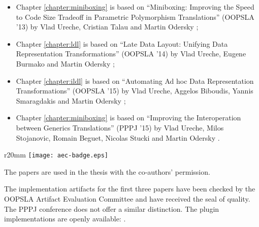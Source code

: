 \begin{itemize}
  \item Chapter \ref{chapter:miniboxing} is based on ``Miniboxing: Improving the Speed to Code Size Tradeoff in Parametric Polymorphism Translations'' (OOPSLA '13) by Vlad Ureche, Cristian Talau and Martin Odersky \cite{miniboxing};
  \item Chapter \ref{chapter:ldl} is based on ``Late Data Layout: Unifying Data Representation Transformations'' (OOPSLA '14) by Vlad Ureche, Eugene Burmako and Martin Odersky \cite{ldl};
  \item Chapter \ref{chapter:ildl} is based on ``Automating Ad hoc Data Representation Transformations'' (OOPSLA '15) by Vlad Ureche, Aggelos Biboudis, Yannis Smaragdakis and Martin Odersky \cite{ildl-tech};
  \item Chapter \ref{chapter:miniboxing} is based on ``Improving the Interoperation between Generics Translations'' (PPPJ '15) by Vlad Ureche, Milos Stojanovic, Romain Beguet, Nicolas Stucki and Martin Odersky \cite{miniboxing-pppj}.
\end{itemize}

\begin{wrapfigure}{r}{20mm}
  \vspace{0.7em}
  \centering
  \texttt{[image: aec-badge.eps]}
  \vspace{-4em}
\end{wrapfigure}

The papers are used in the thesis with the co-authors' permission.

The implementation artifacts for the first three papers have been checked by the OOPSLA Artifact Evaluation Committee and have received the seal of quality. The PPPJ conference does not offer a similar distinction.
The plugin implementations are openly available: \cite{miniboxing-www,ildl-plugin,ldl-staging-plugin,ldl-value-class-plugin,miniboxing-plugin}.
